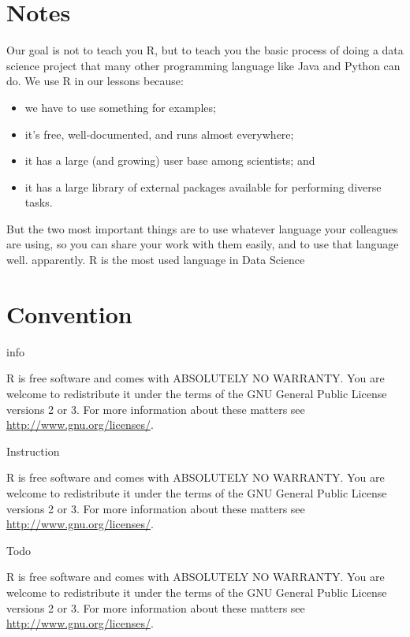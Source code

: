 \documentclass[
]{book}
\makeatletter
\providecommand{\tightlist}{%
  \setlength{\itemsep}{0pt}\setlength{\parskip}{0pt}}
\newenvironment{kframe}{%
\medskip{}
\setlength{\fboxsep}{.8em}
 \def\at@end@of@kframe{}%
 \ifinner\ifhmode%
  \def\at@end@of@kframe{\end{minipage}}%
  \begin{minipage}{\columnwidth}%
 \fi\fi%
 \def\FrameCommand##1{\hskip\@totalleftmargin \hskip-\fboxsep
 \colorbox{shadecolor}{##1}\hskip-\fboxsep
     \hskip-\linewidth \hskip-\@totalleftmargin \hskip\columnwidth}%
 \MakeFramed {\advance\hsize-\width
   \@totalleftmargin\z@ \linewidth\hsize
   \@setminipage}}%
 {\par\unskip\endMakeFramed%
 \at@end@of@kframe}
\newenvironment{rmdblock}[1]
  {
  \begin{itemize}
  \renewcommand{\labelitemi}{
    \raisebox{-.7\height}[0pt][0pt]{
      {\setkeys{Gin}{width=3em,keepaspectratio}\texttt{[image: images/\#1]}}
    }
  }
  \setlength{\fboxsep}{1em}
  \begin{kframe}
  \item
  }
  {
  \end{kframe}
  \end{itemize}
  }
\newenvironment{rmdaction}
  {\begin{rmdblock}{action}}
  {\end{rmdblock}}
\newenvironment{rmdinstruction}
  {\begin{rmdblock}{instruction}}
  {\end{rmdblock}}
\newenvironment{rmdinfo}
  {\begin{rmdblock}{info}}
  {\end{rmdblock}}
\makeatother
\begin{document}
\hypertarget{notes}{%
\section{Notes}\label{notes}}

Our goal is not to teach you R, but to teach you the basic process of doing a data science project that many other programming language like Java and Python can do. We use R in our lessons because:

\begin{itemize}
\tightlist
\item
  we have to use something for examples;
\item
  it's free, well-documented, and runs almost everywhere;
\item
  it has a large (and growing) user base among scientists; and
\item
  it has a large library of external packages available for performing diverse tasks.
\end{itemize}

But the two most important things are to use whatever language your colleagues are using, so you can share your work with them easily, and to use that language well. apparently. R is the most used language in Data Science

\hypertarget{convention}{%
\section{Convention}\label{convention}}

info

\begin{rmdinfo}
R is free software and comes with ABSOLUTELY NO WARRANTY.
You are welcome to redistribute it under the terms of the
GNU General Public License versions 2 or 3.
For more information about these matters see
\url{http://www.gnu.org/licenses/}.
\end{rmdinfo}
Instruction

\begin{rmdinstruction}
R is free software and comes with ABSOLUTELY NO WARRANTY.
You are welcome to redistribute it under the terms of the
GNU General Public License versions 2 or 3.
For more information about these matters see
\url{http://www.gnu.org/licenses/}.
\end{rmdinstruction}

Todo

\begin{rmdaction}
R is free software and comes with ABSOLUTELY NO WARRANTY.
You are welcome to redistribute it under the terms of the
GNU General Public License versions 2 or 3.
For more information about these matters see
\url{http://www.gnu.org/licenses/}.
\end{rmdaction}
\end{document}
